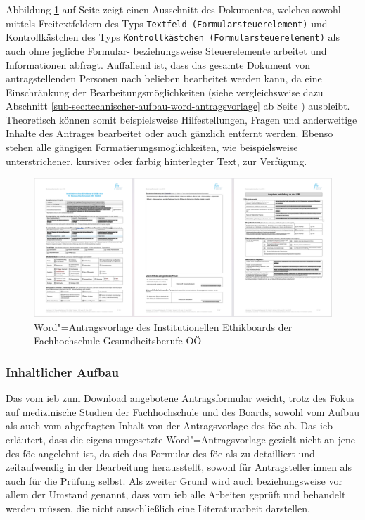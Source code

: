 \documentclass[a4paper,12pt,twoside]{scrreprt}
\begin{document}
\medskip

Abbildung \ref{fig:dokumentenvorlage-ieb} auf Seite \pageref{fig:dokumentenvorlage-ieb} zeigt einen Ausschnitt des Dokumentes, welches sowohl mittels Freitextfeldern des Typs \texttt{Textfeld (Formularsteuerelement)} und Kontrollkästchen des Typs \texttt{Kontrollkästchen (Formularsteuerelement)} als auch ohne jegliche Formular- beziehungsweise Steuerelemente arbeitet und Informationen abfragt. Auffallend ist, dass das gesamte Dokument von antragstellenden Personen nach belieben bearbeitet werden kann, da eine Einschränkung der Bearbeitungsmöglichkeiten (siehe vergleichsweise dazu Abschnitt \ref{sub-sec:technischer-aufbau-word-antragsvorlage} ab Seite \pageref{sub-sec:technischer-aufbau-word-antragsvorlage}) ausbleibt. Theoretisch können somit beispielsweise Hilfestellungen, Fragen und anderweitige Inhalte des Antrages bearbeitet oder auch gänzlich entfernt werden. Ebenso stehen alle gängigen Formatierungsmöglichkeiten, wie beispielsweise unterstrichener, kursiver oder farbig hinterlegter Text, zur Verfügung.

\begin{figure}[ht]
    \centering
    \includegraphics[scale=0.21]{thesis/images/Luidold_Word-Vorlage-IEB-FH-Gesundheitsberufe-OOE.png}
    \caption[Word"=Antragsvorlage des Institutionellen Ethikboards der Fachhochschule Gesundheitsberufe OÖ]{Word"=Antragsvorlage des Institutionellen Ethikboards der Fachhochschule Gesundheitsberufe OÖ \cite{fh_gesundheitsberufe_oo_gmbh_dokumente_2023}}
    \label{fig:dokumentenvorlage-ieb}
\end{figure}

\subsubsection*{Inhaltlicher Aufbau}
\label{sub-sub-sec:fh-oö-inhaltlicher-aufbau}

Das vom \ac{ieb} zum Download angebotene Antragsformular weicht, trotz des Fokus auf medizinische Studien der Fachhochschule und des Boards, sowohl vom Aufbau als auch vom abgefragten Inhalt von der Antragsvorlage des \ac{föe} ab. Das \ac{ieb} erläutert, dass die eigens umgesetzte Word"=Antragsvorlage gezielt nicht an jene des \ac{föe} angelehnt ist, da sich das Formular des \ac{föe} als zu detailliert und zeitaufwendig in der Bearbeitung herausstellt, sowohl für Antragsteller:innen als auch für die Prüfung selbst. Als zweiter Grund wird auch beziehungsweise vor allem der Umstand genannt, dass vom \ac{ieb} alle Arbeiten geprüft und behandelt werden müssen, die nicht ausschließlich eine Literaturarbeit darstellen. \cite{rosendahl-huber_extern-erfahrungen_2023}
\end{document}
